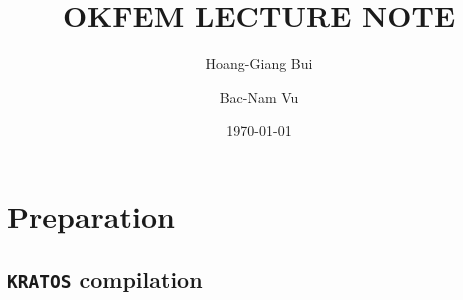 \documentclass[12pt,a4paper,twoside]{article}
\title{\textbf{OKFEM} LECTURE NOTE}
\author{Hoang-Giang Bui \and Bac-Nam Vu}
\date{\today}
\begin{document}
 

\newcommand{\xs}[1]{\raisebox{1.5ex}[-1.5ex]{#1}}
     \textwidth 165mm
     \textheight 235mm
     \topmargin -18mm

\newcommand{\kratos}{\texttt{KRATOS}\xspace}
\newcommand{\python}{\texttt{Python}\xspace}
\newcommand{\git}{\texttt{git}\xspace}
\newcommand{\github}{\texttt{GitHub}\xspace}
\newcommand{\cmake}{\texttt{cmake}\xspace}
\newcommand{\boost}{\texttt{boost}\xspace}


\maketitle

\section{Preparation}

\subsection{\kratos compilation}
\end{document}
